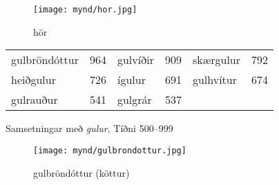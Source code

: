 \documentclass[../samsetningasafn.tex]{subfiles}
\begin{document}
\begin{figure}[H]
\begin{tcolorbox}
\centering
	\texttt{[image: mynd/hor.jpg]}
\end{tcolorbox}
	\caption{hör}
	\label{mynd:hor}
\end{figure}

\begin{wordlist}[H]
\begin{tcolorbox}

	\setlength{\extrarowheight}{4pt}
	\begin{tabular}{BlBlBl}
		gulbröndóttur	& 964		& 	
		gulvíðir			& 909		& 
		skærgulur		& 792		\\ 	
		heiðgulur		& 726		& 	
		ígulur			& 691		&   	
		gulhvítur			& 674		\\ 
		gulrauður		& 541		& 
		gulgrár			& 537		& 	
						& 
	\end{tabular}

\end{tcolorbox}
	\caption{Samsetningar með \textit{gulur}, Tíðni 500--999}
	\label{listi:gult.500}
\end{wordlist}

\begin{figure}[H]
\begin{tcolorbox}
\centering
	\texttt{[image: mynd/gulbrondottur.jpg]}
\end{tcolorbox}
	\caption{gulbröndóttur (köttur)}
	\label{mynd:gulbrondottur}
\end{figure}
\end{document}
